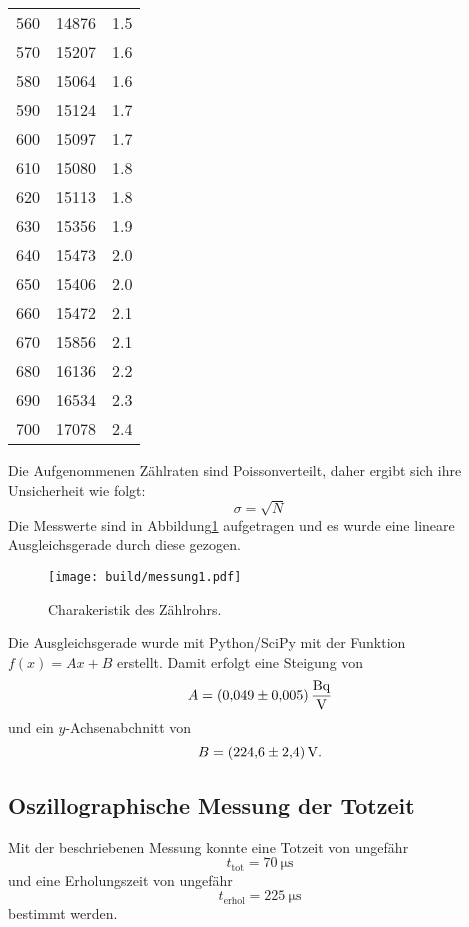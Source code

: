 \begin{table}
\begin{tabular}{S[table-format=3.0] S[table-format=5.0] S[table-format=1.2(0)e0]}
        560 & 14876 & 1.5 \\
        570 & 15207 & 1.6 \\
        580 & 15064 & 1.6 \\
        590 & 15124 & 1.7 \\
        600 & 15097 & 1.7 \\
        610 & 15080 & 1.8 \\
        620 & 15113 & 1.8 \\
        630 & 15356 & 1.9 \\
        640 & 15473 & 2.0 \\
        650 & 15406 & 2.0 \\
        660 & 15472 & 2.1 \\
        670 & 15856 & 2.1 \\
        680 & 16136 & 2.2 \\
        690 & 16534 & 2.3 \\
        700 & 17078 & 2.4 \\
        \bottomrule
    \end{tabular}
\end{table}
\noindent Die Aufgenommenen Zählraten sind Poissonverteilt, daher ergibt sich ihre Unsicherheit wie folgt:
\begin{equation}
  \sigma = \sqrt{N}
\end{equation}
Die Messwerte sind in Abbildung\ref{fig:plot} aufgetragen und es wurde eine lineare Ausgleichsgerade durch diese gezogen.
\begin{figure}[H]
  \centering
  \texttt{[image: build/messung1.pdf]}
  \caption{Charakeristik des Zählrohrs.}
  \label{fig:plot}
\end{figure}
\noindent  Die Ausgleichsgerade wurde mit Python/SciPy mit der Funktion $f(x)= Ax + B$ erstellt.
Damit erfolgt eine Steigung von
\begin{equation}
  A = \SI{0.049 \pm 0.005}{\becquerel\per\volt}
\end{equation}
und ein $y$-Achsenabchnitt von
\begin{equation}
  B =   \SI[per-mode=reciprocal]{224.6\pm 2.4}{\volt}        .
\end{equation}
\subsection{Oszillographische Messung der Totzeit}
Mit der beschriebenen Messung konnte eine Totzeit von ungefähr
\begin{equation*}
  t_\text{tot} = \SI{70}{\micro \second}
\end{equation*}
und eine Erholungszeit von ungefähr
\begin{equation*}
    t_\text{erhol} = \SI{225}{\micro\second}
\end{equation*}
bestimmt werden.
